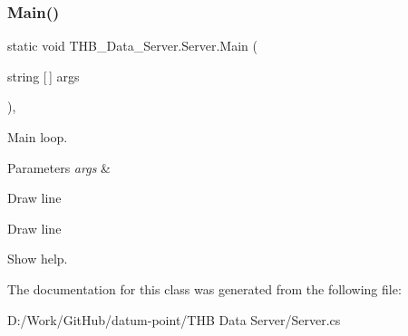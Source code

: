 \subsubsection{\texorpdfstring{Main()}{Main()}}
{\footnotesize\ttfamily static void T\+H\+B\+\_\+\+Data\+\_\+\+Server.\+Server.\+Main (\begin{DoxyParamCaption}\item[{string \mbox{[}$\,$\mbox{]}}]{args }\end{DoxyParamCaption})\hspace{0.3cm}{\ttfamily [static]}, {\ttfamily [private]}}



Main loop. 


\begin{DoxyParams}{Parameters}
{\em args} & \\
\hline
\end{DoxyParams}
Draw line

Draw line

Show help. 

The documentation for this class was generated from the following file\+:\begin{DoxyCompactItemize}
\item 
D\+:/\+Work/\+Git\+Hub/datum-\/point/\+T\+H\+B Data Server/Server.\+cs\end{DoxyCompactItemize}
